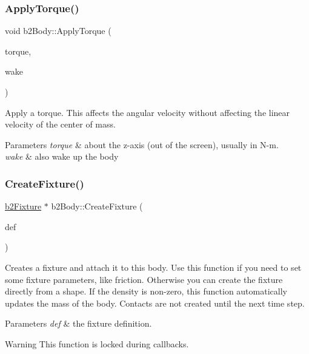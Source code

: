 \subsubsection{\texorpdfstring{Apply\+Torque()}{ApplyTorque()}}
{\footnotesize\ttfamily void b2\+Body\+::\+Apply\+Torque (\begin{DoxyParamCaption}\item[{float32}]{torque,  }\item[{bool}]{wake }\end{DoxyParamCaption})\hspace{0.3cm}{\ttfamily [inline]}}

Apply a torque. This affects the angular velocity without affecting the linear velocity of the center of mass. 
\begin{DoxyParams}{Parameters}
{\em torque} & about the z-\/axis (out of the screen), usually in N-\/m. \\
\hline
{\em wake} & also wake up the body \\
\hline
\end{DoxyParams}
\mbox{\label{classb2_body_aa4892301e9b9d62ede5e93dad1743894}} 
\subsubsection{\texorpdfstring{Create\+Fixture()}{CreateFixture()}\hspace{0.1cm}{\footnotesize\ttfamily [1/2]}}
{\footnotesize\ttfamily \hyperlink{classb2_fixture}{b2\+Fixture} $\ast$ b2\+Body\+::\+Create\+Fixture (\begin{DoxyParamCaption}\item[{const \hyperlink{structb2_fixture_def}{b2\+Fixture\+Def} $\ast$}]{def }\end{DoxyParamCaption})}

Creates a fixture and attach it to this body. Use this function if you need to set some fixture parameters, like friction. Otherwise you can create the fixture directly from a shape. If the density is non-\/zero, this function automatically updates the mass of the body. Contacts are not created until the next time step. 
\begin{DoxyParams}{Parameters}
{\em def} & the fixture definition. \\
\hline
\end{DoxyParams}
\begin{DoxyWarning}{Warning}
This function is locked during callbacks. 
\end{DoxyWarning}
\mbox{\label{classb2_body_a52d971867086d5db79769a62bbb70a60}} 
